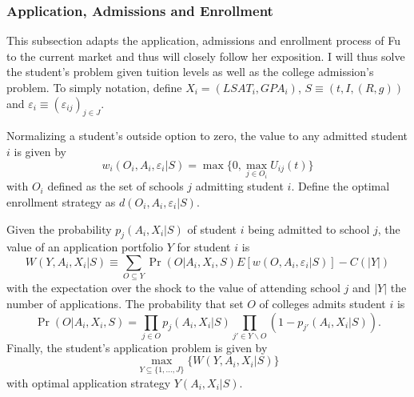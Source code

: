 \documentclass[12pt]{article}
\theoremstyle{definition}
\begin{document}
\subsubsection{Application, Admissions and Enrollment}
\label{sec:app_admit_enroll}

This subsection adapts the application, admissions and enrollment process of Fu~\cite{Fu} to the current market and thus will closely follow her exposition. I will thus solve the student's problem given tuition levels as well as the college admission's problem. To simply notation, define $X_i = (LSAT_i, GPA_i)$,  $S \equiv (t, I, (R, g))$ and $\varepsilon_i \equiv (\varepsilon_{ij})_{j\in J}$.

Normalizing a student's outside option to zero, the value to any admitted student $i$ is given by
\begin{equation}
  w_i(O_i, A_i, \varepsilon_i | S) = \max\{0, \max_{j\in O_i} U_{ij}(t)\}
  \label{eq:val_students}
\end{equation}
with $O_{i}$ defined as the set of schools $j$ admitting student $i$. Define the optimal enrollment strategy as $d(O_i, A_i, \varepsilon_i | S)$.

Given the probability $p_j(A_i, X_i|S)$ of student $i$ being admitted to school $j$, the value of an application portfolio $Y$ for student $i$ is
\begin{equation}
  W(Y, A_i, X_i|S) \equiv \sum_{O\subseteq Y} \Pr(O|A_i, X_i, S)E[w(O, A_i, \varepsilon_i|S)] - C(|Y|)
\end{equation}
with the expectation over the shock to the value of attending school $j$ and $|Y|$ the number of applications. The probability that set $O$ of colleges admits student $i$ is
\begin{equation}
  \Pr(O|A_i, X_i, S) = \prod_{j\in O}p_j(A_i, X_i|S)
                       \prod_{j'\in Y\backslash O} (1 - p_{j'}(A_i, X_i|S)).
\end{equation}
Finally, the student's application problem is given by
\begin{equation}
  \max_{Y\subseteq\{1, \dots, J\}}\{W(Y, A_i, X_i|S)\}
\end{equation}
with optimal application strategy $Y(A_i, X_i|S)$.
\end{document}
